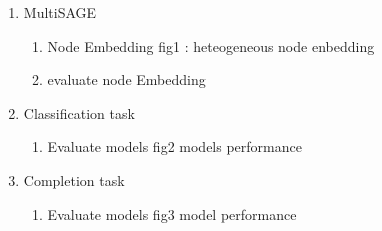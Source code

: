 \begin{enumerate}
    \item MultiSAGE
    \begin{enumerate}
        \item Node Embedding
        \newline fig1 : heteogeneous node enbedding
        \item evaluate node Embedding
    \end{enumerate}
    \item Classification task
    \begin{enumerate}
        \item Evaluate models
        \newline fig2 models performance
    \end{enumerate}
    \item Completion task
    \begin{enumerate}
        \item Evaluate models
        \newline fig3 model performance
    \end{enumerate}
\end{enumerate}


